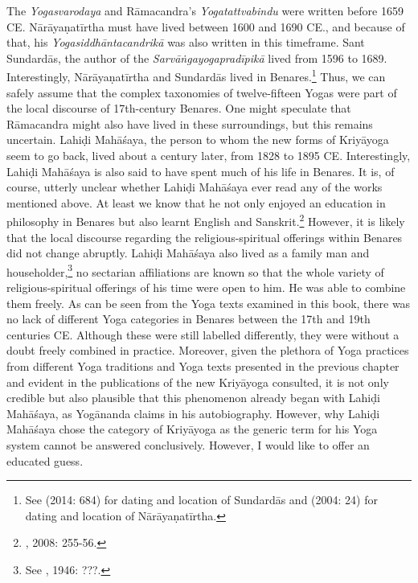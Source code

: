 The \textit{Yogasvarodaya} and Rāmacandra's \textit{Yogatattvabindu} were written before 1659 CE. Nārāyaṇatīrtha must have lived between 1600 and 1690 CE., and because of that, his \textit{Yogasiddhāntacandrikā} was also written in this timeframe. Sant Sundardās, the author of the \textit{Sarvāṅgayogapradīpikā} lived from 1596 to 1689. Interestingly, Nārāyaṇatīrtha and Sundardās lived in Benares.\footnote{See \citeauthor{burger2014sarvangayogapradipika} (2014: 684) for dating and location of Sundardās and \citeauthor{penna2004} (2004: 24) for dating and location of Nārāyaṇatīrtha.} Thus, we can safely assume that the complex taxonomies of twelve-fifteen Yogas were part of the local discourse of 17th-century Benares. One might speculate that Rāmacandra might also have lived in these surroundings, but this remains uncertain. Lahiḍi Mahāśaya, the person to whom the new forms of Kriyāyoga seem to go back, lived about a century later, from 1828 to 1895 CE. Interestingly, Lahiḍi Mahāśaya is also said to have spent much of his life in Benares. It is, of course, utterly unclear whether Lahiḍi Mahāśaya ever read any of the works mentioned above. At least we know that he not only enjoyed an education in philosophy in Benares but also learnt English and Sanskrit.\footnote{\citeauthor{jones2008encyclopedia}, 2008: 255-56.} However, it is likely that the local discourse regarding the religious-spiritual offerings within Benares did not change abruptly. Lahiḍi Mahāśaya also lived as a family man and householder,\footnote{See \citeauthor{autobioyogi}, 1946: ???.} no sectarian affiliations are known so that the whole variety of religious-spiritual offerings of his time were open to him. He was able to combine them freely. As can be seen from the Yoga texts examined in this book, there was no lack of different Yoga categories in Benares between the 17th and 19th centuries CE. Although these were still labelled differently, they were without a doubt freely combined in practice. Moreover, given the plethora of Yoga practices from different Yoga traditions and Yoga texts presented in the previous chapter and evident in the publications of the new Kriyāyoga consulted, it is not only credible but also plausible that this phenomenon already began with Lahiḍi Mahāśaya, as Yogānanda claims in his autobiography. However, why Lahiḍi Mahāśaya chose the category of Kriyāyoga as the generic term for his Yoga system cannot be answered conclusively. However, I would like to offer an educated guess.

